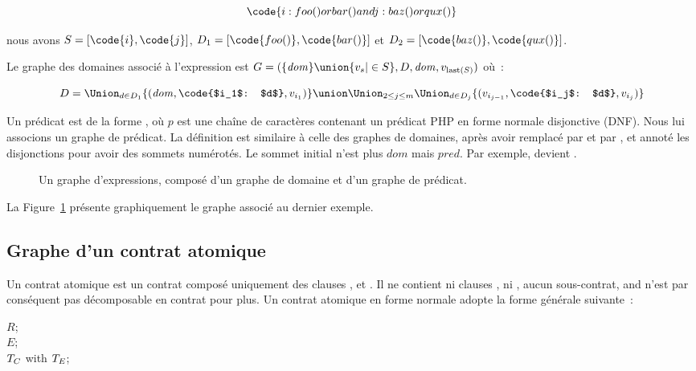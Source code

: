 $$\code{i: foo() or bar() and j: baz() or qux()}$$

nous avons $S = [\code{i}, \code{j}]$, $D_1 = [\code{foo()}, \code{bar()}]$ et
$D_2 = [\code{baz()}, \code{qux()}]$.

Le {\strong graphe des domaines} associé à l'expression  est $G = (\{\mathit{dom}\} \union \{v_s \vert \in S\},
D, \mathit{dom}, v_{\mathrm{last}(S)})$ où~:

$$D = \Union_{d \in D_1} \{(\mathit{dom}, \code{$i_1$: $d$}, v_{i_1})\} \union
      \Union_{2 \leq j \leq m}
      \Union_{d \in D_j} \{(v_{i_{j - 1}}, \code{$i_j$: $d$}, v_{i_{j}})\}$$

Un prédicat est de la forme , où $p$ est une chaîne de caractères
contenant un prédicat PHP en forme normale disjonctive (DNF). Nous lui associons
un {\strong graphe de prédicat}. La définition est similaire à celle des graphes
de domaines, après avoir remplacé \code{\&\&} par  et \code{||} par
, et annoté les disjonctions pour avoir des sommets numérotés. Le
sommet initial n'est plus $\mathit{dom}$ mais $\mathit{pred}$. Par exemple,
 devient .

\begin{figure}


\caption{\label{figure:test:expression_graph} Un graphe d'expressions, composé
d'un graphe de domaine et d'un graphe de prédicat.}

\end{figure}

La Figure~\ref{figure:test:expression_graph} présente graphiquement le graphe
associé au dernier exemple.

\subsection{Graphe d'un contrat atomique}
\label{subsection:test:atomic_graph}

Un {\strong contrat atomique} est un contrat composé uniquement des clauses
\arequires, \aensures et \athrowable. Il ne contient ni clauses \abehavior, ni
\adefault, \ie aucun sous-contrat, and n'est par conséquent pas décomposable en
contrat pour plus. Un contrat atomique en forme normale adopte la forme générale
suivante~:

\begin{pre}
\arequires  \(R\); \\
\aensures   \(E\); \\
\athrowable \(T\sb{C}\) with \(T\sb{E}\);
\end{pre}

